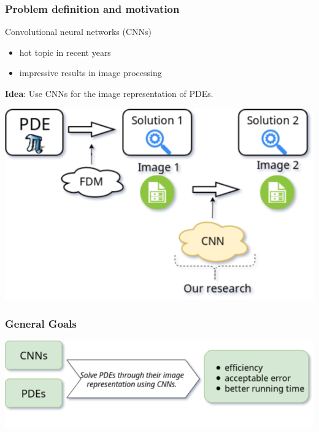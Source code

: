 \documentclass[18pt]{beamer}
\begin{document}
\begin{frame}
  \frametitle{Problem definition and motivation}
  Convolutional neural networks (CNNs)
  \begin{itemize}
  \item hot topic in recent years
  \item impressive results in image processing
  \end{itemize}
  \textbf{Idea}: Use CNNs for the image representation of PDEs.
  \vspace{0.8cm}
  \begin{center}
    \includegraphics[scale=0.35]{images/general}
  \end{center}

\end{frame}

\begin{frame}
  \frametitle{General Goals}
  \begin{center}
    \includegraphics[scale=0.50]{images/bringing_cnn_and_pde}
  \end{center}  
\end{frame}
\end{document}
